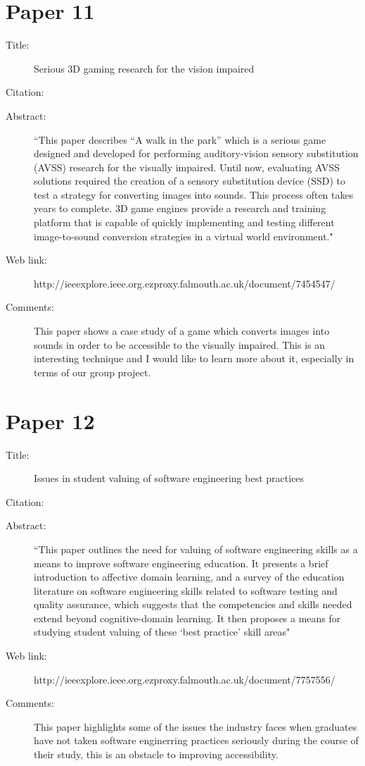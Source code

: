 \documentclass{scrartcl}
\begin{document}
\section*{Paper 11}
\begin{description}
\item[Title:] Serious 3D gaming research for the vision impaired
\item[Citation:] \cite{Marshall}
\item[Abstract:] ``This paper describes “A walk in the park” which is a serious game designed and developed for performing auditory-vision sensory substitution (AVSS) research for the visually impaired. Until now, evaluating AVSS solutions required the creation of a sensory substitution device (SSD) to test a strategy for converting images into sounds. This process often takes years to complete. 3D game engines provide a research and training platform that is capable of quickly implementing and testing different image-to-sound conversion strategies in a virtual world environment."
\item[Web link:] http://ieeexplore.ieee.org.ezproxy.falmouth.ac.uk/document/7454547/
\item[Comments:] This paper shows a case study of a game which converts images into sounds in order to be accessible to the visually impaired. This is an interesting technique and I would like to learn more about it, especially in terms of our group project.
\end{description}

\section*{Paper 12}
\begin{description}
\item[Title:] Issues in student valuing of software engineering best practices
\item[Citation:] \cite{Frezza}
\item[Abstract:] ``This paper outlines the need for valuing of software engineering skills as a means to improve software engineering education. It presents a brief introduction to affective domain learning, and a survey of the education literature on software engineering skills related to software testing and quality assurance, which suggests that the competencies and skills needed extend beyond cognitive-domain learning. It then proposes a means for studying student valuing of these `best practice' skill areas"
\item[Web link:] http://ieeexplore.ieee.org.ezproxy.falmouth.ac.uk/document/7757556/
\item[Comments:] This paper highlights some of the issues the industry faces when graduates have not taken software enginerring practices seriously during the course of their study, this is an obstacle to improving accessibility.
\end{description}
\end{document}
